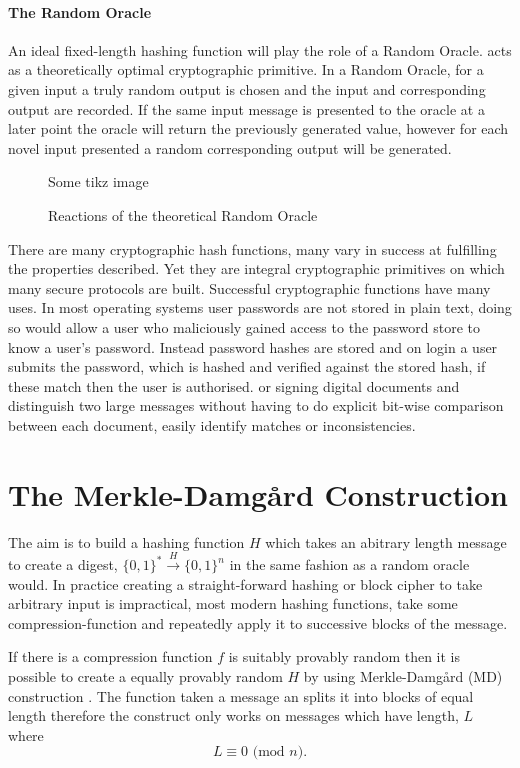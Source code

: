 \documentclass[a4paper,12pt]{article}
\begin{document}
\paragraph{The Random Oracle} An ideal fixed-length hashing function will play the role of a Random Oracle. acts as a theoretically optimal cryptographic primitive. In a Random Oracle, for a given input a truly random output is chosen and the input and corresponding output are recorded. If the same input message is presented to the oracle at a later point the oracle will return the previously generated value, however for each novel input presented a random corresponding output will be generated.\\

\begin{figure}
Some tikz image
\caption{Reactions of the theoretical Random Oracle}
\label{fig:random_oracle}
\end{figure}


There are many cryptographic hash functions, many vary in success at fulfilling the properties described. Yet they are integral cryptographic primitives on which many secure protocols are built. Successful cryptographic functions have many uses. In most operating systems user passwords are not stored in plain text, doing so would allow a user who maliciously gained access to the password store to know a user's password. Instead password hashes are stored and on login a user submits the password, which is hashed and verified against the stored hash, if these match then the user is authorised. {\color{red} or signing digital documents and distinguish two large messages without having to do explicit bit-wise comparison between each document, easily identify matches or inconsistencies. }

\section{The Merkle-Damg\r{a}rd Construction}
The aim is to build a hashing function $H$ which takes an abitrary length message to create a digest, $\{0,1\}^* \xrightarrow{H} \{0,1\}^n$ in the same fashion as a random oracle would. In practice creating a straight-forward hashing or block cipher to take arbitrary input is impractical, most modern hashing functions, take some compression-function and repeatedly apply it to successive blocks of the message.

If there is a compression function $f$ is suitably provably random then it is possible to create a equally provably random $H$ by using Merkle-Damg\r{a}rd (MD) construction \cite{Merkle1979}. The function taken a message an splits it into blocks of equal length therefore the construct only works on messages which have length, $L$ where $$L \equiv 0 \text{ (mod } n).$$
\end{document}
